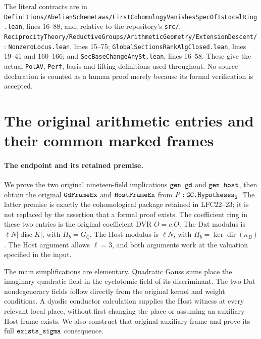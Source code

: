 \documentclass[11pt,a4paper]{article}
\numberwithin{equation}{section}
\theoremstyle{remark}\newtheorem{remark}[theorem]{Remark}
\begin{document}
{The literal contracts are in
\texttt{Definitions/\allowbreak Abelian\allowbreak Scheme\allowbreak Laws/\allowbreak First\allowbreak Cohomology\allowbreak Vanishes\allowbreak Spec\allowbreak Of\allowbreak Is\allowbreak Local\allowbreak Ring.\allowbreak lean},
lines 16--88, and, relative to the repository's \texttt{src/\allowbreak },
\texttt{Reciprocity\allowbreak Theory/\allowbreak Reductive\allowbreak Groups/\allowbreak Arithmetic\allowbreak Geometry/\allowbreak Extension\allowbreak Descent/\allowbreak }:
\texttt{Nonzero\allowbreak Locus.\allowbreak lean}, lines 15--75;
\texttt{Global\allowbreak Sections\allowbreak Rank\allowbreak Alg\allowbreak Closed.\allowbreak lean}, lines 19--41 and 160--166;
and \texttt{Sec\allowbreak Base\allowbreak Change\allowbreak Any\allowbreak St.\allowbreak lean}, lines 16--58.
These give the actual \texttt{Pol\allowbreak AV}, \texttt{Perf}, basis and lifting
definitions used throughout.  No source declaration is counted as a
human proof merely because its formal verification is accepted.
\par}


\section{The original arithmetic entries and their common marked frames}
\label{sec:arithmetic-frame-entries}

\paragraph{The endpoint and its retained premise.}
We prove the two original nineteen-field implications
\(\texttt{gen\_\allowbreak gd}\) and \(\texttt{gen\_\allowbreak host}\), then obtain the
original \(\texttt{Gd\allowbreak Frame\allowbreak Ex}\) and \(\texttt{Host\allowbreak Frame\allowbreak Ex}\) from
\(P:\texttt{GC.\allowbreak Hypotheses}_{2}\).
The latter premise is exactly the cohomological package retained
in LFC22--23; it is not replaced by the assertion that a formal
proof exists.  The coefficient ring in these two entries is the
original coefficient DVR \(O=c.O\).
The Dat modulus is \(\ell N|\operatorname{disc}K|\), with
\(H_b=G_{\mathbb Q}\).  The Host modulus is \(\ell N\), with
\(H_b=\ker\operatorname{dir}(\kappa_B)\).
The Host argument allows \(\ell=3\), and both arguments work at
the valuation specified in the input.

The main simplifications are elementary.  Quadratic Gauss sums
place the imaginary quadratic field in the cyclotomic field of
its discriminant.  The two Dat nondegeneracy fields follow
directly from the original kernel and weight conditions.
A dyadic conductor calculation supplies the Host witness at
every relevant local place, without first changing the place
or assuming an auxiliary Host frame exists.  We also construct
that original auxiliary frame and prove its full
\(\texttt{exists\_\allowbreak sigma}\) consequence.
\end{document}

